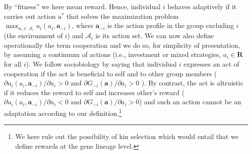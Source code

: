 \documentclass[12pt]{article}
\begin{document}
By ``fitness'' we here mean reward. Hence, individual $i$ behaves adaptively if it carries out action $a^\ast$ that solves the maximization problem $\max_{a_i \in \mathcal{A}_i}u_i(a_i,\mathbf{a}_{-i})$, where $\mathbf{a}_{-i}$ is the action profile in the group excluding $i$ (the environment of $i$) and $\mathcal{A}_i$ is its action set. We can now also define operationally the term cooperation and we do so, for simplicity of presentation, by assuming a continuum of actions (i.e., investment or mixed strategies, $a_i \in \mathbf{R}$ for all $i$). We follow sociobiology by saying that individual $i$ expresses an act of cooperation if the act is beneficial to self and to other group members ($\partial u_i(a_i,\mathbf{a}_{-i})/\partial a_i>0$ and $\partial G_{-i}(\mathbf{a})/\partial a_i>0$ \citealp{Rousset04,LehmannK06a,Bshary07}). By contrast, the act is altruistic if
it reduces the reward to self and increases other's reward ($\partial u_i(a_i,\mathbf{a}_{-i})/\partial a_i<0$ and $\partial G_{-i}(\mathbf{a})/\partial a_i>0$) and such an action cannot be an adaptation according to our definition.\footnote{We here rule out the possibility of kin selection which would entail that we define rewards at the gene lineage level.}





\end{document}
